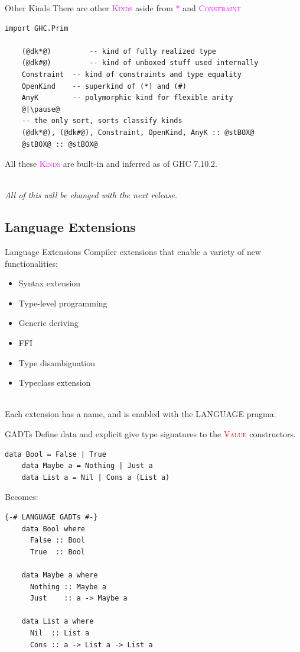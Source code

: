 \documentclass[xcolor={usenames,dvipsnames}]{beamer}
\newcommand{\hvalcon}[1]{\textcolor{Red}{\textsc{#1}}}
\newcommand{\hkind}[1]{\textcolor{Fuchsia}{\textsc{#1}}}
\begin{document}
\begin{frame}[fragile]{Other Kinds}
  There are other \hkind{Kinds} aside from \hkind{*} and \hkind{Constraint}
  \begin{lstlisting}[style=hask]
    import GHC.Prim
    
    (@dk*@)         -- kind of fully realized type
    (@dk#@)         -- kind of unboxed stuff used internally
    Constraint  -- kind of constraints and type equality
    OpenKind    -- superkind of (*) and (#)
    AnyK        -- polymorphic kind for flexible arity
    @|\pause@
    -- the only sort, sorts classify kinds
    (@dk*@), (@dk#@), Constraint, OpenKind, AnyK :: @stBOX@
    @stBOX@ :: @stBOX@
  \end{lstlisting}

  All these \hkind{Kinds} are built-in and inferred as of GHC 7.10.2.
  
  \ \\
  \textit{\tiny{All of this will be changed with the next release.}}
\end{frame}


\subsection{Language Extensions}

\begin{frame}[fragile]{Language Extensions}
  Compiler extensions that enable a variety of new functionalities:
  \pause
  \begin{itemize}
    \item Syntax extension
    \item Type-level programming
    \item Generic deriving
    \item FFI
    \item Type disambiguation
    \item Typeclass extension
  \end{itemize}

  \ \\
  \pause
  Each extension has a name, and is enabled with the LANGUAGE pragma.
\end{frame}

\begin{frame}[fragile]{GADTs}
  Define data and explicit give type signatures to the \hvalcon{Value} constructors.
  \begin{lstlisting}[style=hask]
    data Bool = False | True
    data Maybe a = Nothing | Just a
    data List a = Nil | Cons a (List a)
  \end{lstlisting}

  \pause
  Becomes:
  \begin{lstlisting}[style=hask]
    {-# LANGUAGE GADTs #-}
    data Bool where
      False :: Bool
      True  :: Bool

    data Maybe a where
      Nothing :: Maybe a
      Just    :: a -> Maybe a

    data List a where
      Nil  :: List a
      Cons :: a -> List a -> List a
  \end{lstlisting}
\end{frame}
\end{document}
